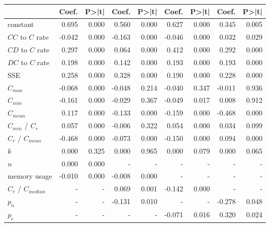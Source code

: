 \begin{tabular}{lrrrrrrrr}
\toprule
{} &  Coef. &  P>|t| &  Coef. &  P>|t| &  Coef. &  P>|t| &  Coef. &  P>|t| \\
\midrule
constant             &  0.695 &  0.000 &  0.560 &  0.000 &  0.627 &  0.000 &  0.345 &  0.005 \\
$CC$ to $C$ rate     & -0.042 &  0.000 & -0.163 &  0.000 & -0.046 &  0.000 &  0.032 &  0.029 \\
$CD$ to $C$ rate     &  0.297 &  0.000 &  0.064 &  0.000 &  0.412 &  0.000 &  0.292 &  0.000 \\
$DC$ to $C$ rate     &  0.198 &  0.000 &  0.142 &  0.000 &  0.193 &  0.000 &  0.193 &  0.000 \\
SSE                  &  0.258 &  0.000 &  0.328 &  0.000 &  0.190 &  0.000 &  0.228 &  0.000 \\
$C_{max}$            & -0.068 &  0.000 & -0.048 &  0.214 & -0.040 &  0.347 & -0.011 &  0.936 \\
$C_{min}$            & -0.161 &  0.000 & -0.029 &  0.367 & -0.049 &  0.017 &  0.008 &  0.912 \\
$C_{mean}$           &  0.117 &  0.000 & -0.133 &  0.000 & -0.159 &  0.000 & -0.468 &  0.000 \\
$C_{min}$ / $C_r$    &  0.057 &  0.000 & -0.006 &  0.322 &  0.054 &  0.000 &  0.034 &  0.099 \\
$C_r$ / $C_{mean}$   & -0.468 &  0.000 & -0.073 &  0.000 & -0.150 &  0.000 &  0.094 &  0.000 \\
$k$                  &  0.000 &  0.325 &  0.000 &  0.965 &  0.000 &  0.079 &  0.000 &  0.065 \\
$n$                  &  0.000 &  0.000 &      - &      - &      - &      - &      - &      - \\
memory usage         & -0.010 &  0.000 & -0.008 &  0.000 &      - &      - &      - &      - \\
$C_r$ / $C_{median}$ &      - &      - &  0.069 &  0.001 & -0.142 &  0.000 &      - &      - \\
$p_n$                &      - &      - & -0.131 &  0.010 &      - &      - & -0.278 &  0.048 \\
$p_e$                &      - &      - &      - &      - & -0.071 &  0.016 &  0.320 &  0.024 \\
\bottomrule
\end{tabular}
